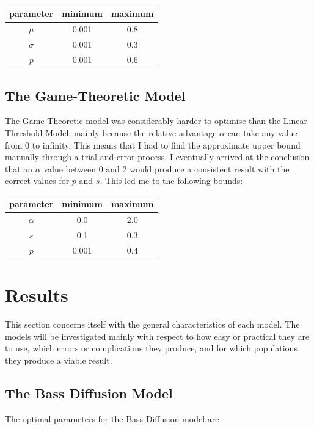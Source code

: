 \documentclass[11pt]{article}
\begin{document}
	\begin{table}[H]
		\centering
		\begin{tabular}{|c|c|c|}
			\hline
			parameter & minimum & maximum \\ \hline
			$\mu$     & 0.001   & 0.8     \\ \hline
			$\sigma$  & 0.001   & 0.3     \\ \hline
			$p$       & 0.001   & 0.6     \\ \hline
		\end{tabular}
	\end{table}
	
	\subsection{The Game-Theoretic Model} \label{sec:fitting-GTM}
	
	The Game-Theoretic model was considerably harder to optimise than the Linear Threshold Model, mainly because the relative advantage $\alpha$ can take any value from 0 to infinity. This means that I had to find the approximate upper bound manually through a trial-and-error process. I eventually arrived at the conclusion that an $\alpha$ value between 0 and 2 would produce a consistent result with the correct values for $p$ and $s$. This led me to the following bounds:
	
	\begin{table}[H]
		\centering
		\begin{tabular}{|c|c|c|}
			\hline
			parameter & minimum  & maximum \\ \hline
			$\alpha$  & 0.0      & 2.0     \\ \hline
			$s$       & 0.1      & 0.3     \\ \hline
			$p$       & 0.001    & 0.4     \\ \hline
		\end{tabular}
	\end{table}
		
	\section{Results}
	This section concerns itself with the general characteristics of each model. The models will be investigated mainly with respect to how easy or practical they are to use, which errors or complications they produce, and for which populations they produce a viable 
	result.
	
	\subsection{The Bass Diffusion Model}
	The optimal parameters for the Bass Diffusion model are
	
\end{document}
